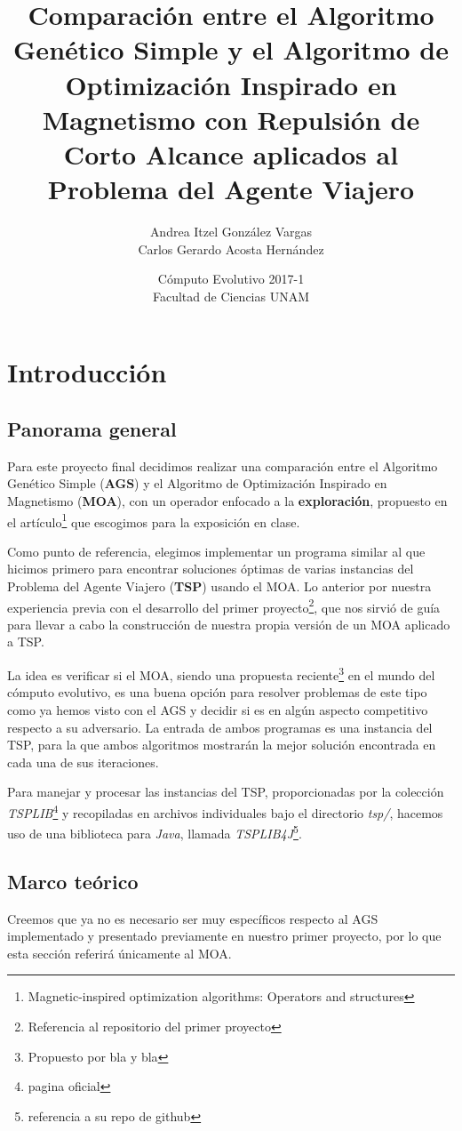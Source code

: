 \documentclass[12pt]{article}
\title{Comparación entre el Algoritmo Genético Simple y el Algoritmo de Optimización Inspirado en Magnetismo con Repulsión de Corto Alcance aplicados al Problema del Agente Viajero}
\author{Andrea Itzel González Vargas \\
  Carlos Gerardo Acosta Hernández}
\date{Cómputo Evolutivo 2017-1 \\ Facultad de Ciencias UNAM \\ }
\begin{document}
\maketitle
\section*{Introducción}
\subsection*{Panorama general}
Para este proyecto final decidimos realizar una comparación entre el Algoritmo Genético Simple (\textbf{AGS}) y el Algoritmo de Optimización Inspirado en Magnetismo (\textbf{MOA}),
con un operador enfocado a la \textbf{exploración}, propuesto en el artículo\footnote{Magnetic-inspired optimization algorithms: Operators and structures} que escogimos para la exposición en clase.

Como punto de referencia, elegimos implementar un programa similar al que hicimos primero para encontrar soluciones óptimas de
varias instancias del Problema del Agente Viajero (\textbf{TSP}) usando el MOA. Lo anterior por nuestra experiencia previa con el desarrollo del primer proyecto\footnote{Referencia al repositorio del primer proyecto}, que nos sirvió de guía para llevar a cabo la construcción de nuestra propia versión de un MOA aplicado a TSP.

La idea es verificar si el MOA, siendo una propuesta reciente\footnote{Propuesto por bla y bla} en el mundo del cómputo evolutivo, es una buena opción para resolver problemas de este tipo como ya hemos visto con el AGS y decidir si es en algún aspecto competitivo respecto a su adversario.
La entrada de ambos programas es una instancia del TSP, para la que ambos algoritmos mostrarán la mejor solución encontrada en cada una de sus iteraciones.

Para manejar y procesar las instancias del TSP, proporcionadas por la colección \textit{TSPLIB}\footnote{pagina oficial} y recopiladas en archivos individuales bajo el directorio \textit{tsp/}, hacemos uso de una
biblioteca para \textit{Java}, llamada \textit{TSPLIB4J}\footnote{referencia a su repo de github}.


\subsection*{Marco teórico}
Creemos que ya no es necesario ser muy específicos respecto al AGS implementado y presentado previamente en nuestro primer proyecto, por lo que esta
sección referirá únicamente al MOA.\\
\end{document}
